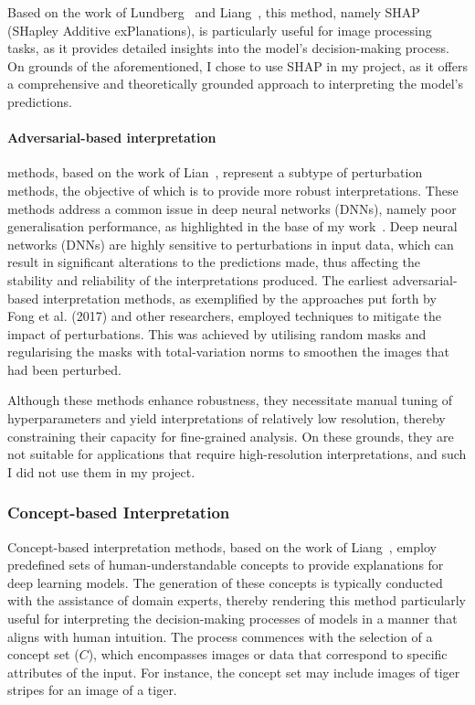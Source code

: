 Based on the work of Lundberg~\cite{lundberg2017unifiedapproachinterpretingmodel} and Liang~\cite{LIANG2021168},
this method, namely SHAP (SHapley Additive exPlanations), is particularly useful for image processing tasks, as it provides detailed insights into the model's decision-making process.
On grounds of the aforementioned, I chose to use SHAP in my project, as it offers a comprehensive and theoretically grounded approach to interpreting the model's predictions.

\paragraph{Adversarial-based interpretation}\label{par:adversarial-based-interpretation}

methods, based on the work of Lian~\cite{LIANG2021168},
represent a subtype of perturbation methods,
the objective of which is to provide more robust interpretations.
These methods address a common issue in deep neural networks (DNNs), namely poor generalisation performance, as highlighted in the base of my work~\cite{LIANG2021168}.
Deep neural networks (DNNs) are highly sensitive to perturbations in input data, which can result in significant alterations to the predictions made,
thus affecting the stability and reliability of the interpretations produced.
The earliest adversarial-based interpretation methods, as exemplified by the approaches put forth by Fong et al. (2017) and other researchers,
employed techniques to mitigate the impact of perturbations.
This was achieved by utilising random masks and regularising the masks with total-variation norms to smoothen the images that had been perturbed.

Although these methods enhance robustness, they necessitate manual tuning of hyperparameters and yield interpretations of relatively low resolution,
thereby constraining their capacity for fine-grained analysis.
On these grounds, they are not suitable for applications that require high-resolution interpretations, and such I did not use them in my project.

\subsubsection{Concept-based Interpretation}\label{subsubsec:concept-based-interpretation}

Concept-based interpretation methods, based on the work of Liang~\cite{LIANG2021168}, employ predefined sets of human-understandable concepts to provide explanations for deep learning models.
The generation of these concepts is typically conducted with the assistance of domain experts, thereby rendering this method particularly
useful for interpreting the decision-making processes of models in a manner that aligns with human intuition.
The process commences with the selection of a concept set (\(C\)), which encompasses images or data that correspond to specific attributes of the input.
For instance, the concept set may include images of tiger stripes for an image of a tiger.

